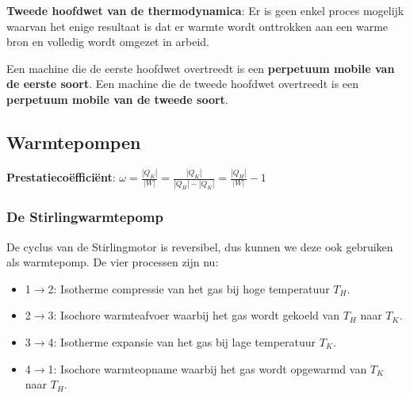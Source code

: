 \begin{postulate}
    \textbf{Tweede hoofdwet van de thermodynamica}: Er is geen enkel proces mogelijk waarvan het enige resultaat is dat er warmte wordt onttrokken aan een warme bron en volledig wordt omgezet in arbeid.
\end{postulate}

Een machine die de eerste hoofdwet overtreedt is een \textbf{perpetuum mobile van de eerste soort}. Een machine die de tweede hoofdwet overtreedt is een \textbf{perpetuum mobile van de tweede soort}.

\subsection{Warmtepompen}

\begin{definition}
    \textbf{Prestatiecoëfficiënt}: \(\omega= \frac{|Q_K|}{|W|} = \frac{|Q_K|}{|Q_H| - |Q_K|} = \frac{|Q_H|}{|W|} - 1\)
\end{definition}

\subsubsection{De Stirlingwarmtepomp}

De cyclus van de Stirlingmotor is reversibel, dus kunnen we deze ook gebruiken als warmtepomp.
De vier processen zijn nu:
\begin{itemize}
    \item 1\(\to\)2: Isotherme compressie van het gas bij hoge temperatuur \(T_H\).
    \item 2\(\to\)3: Isochore warmteafvoer waarbij het gas wordt gekoeld van \(T_H\) naar \(T_K\).
    \item 3\(\to\)4: Isotherme expansie van het gas bij lage temperatuur \(T_K\).
    \item 4\(\to\)1: Isochore warmteopname waarbij het gas wordt opgewarmd van \(T_K\) naar \(T_H\).
\end{itemize}

